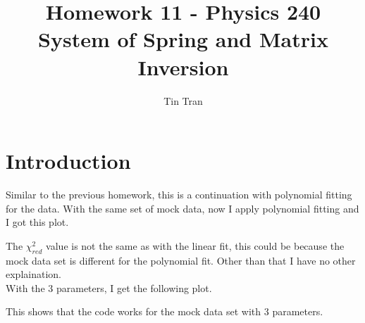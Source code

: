 \documentclass{article}
\begin{document}
\title{Homework 11 - Physics 240\\
		System of Spring and Matrix Inversion}
\author{Tin Tran}

\maketitle

\section{Introduction}
Similar to the previous homework, this is a continuation with polynomial fitting for the data. With the same set of mock data, now I apply polynomial fitting and I got this plot.
\begin{figure}[H]
\end{figure}
The $\chi ^2 _{red}$ value is not the same as with the linear fit, this could be because the mock data set is different for the polynomial fit. Other than that I have no other explaination.\\
With the 3 parameters, I get the following plot.
\begin{figure}[H]
\end{figure}
This shows that the code works for the mock data set with 3 parameters.
\end{document}
